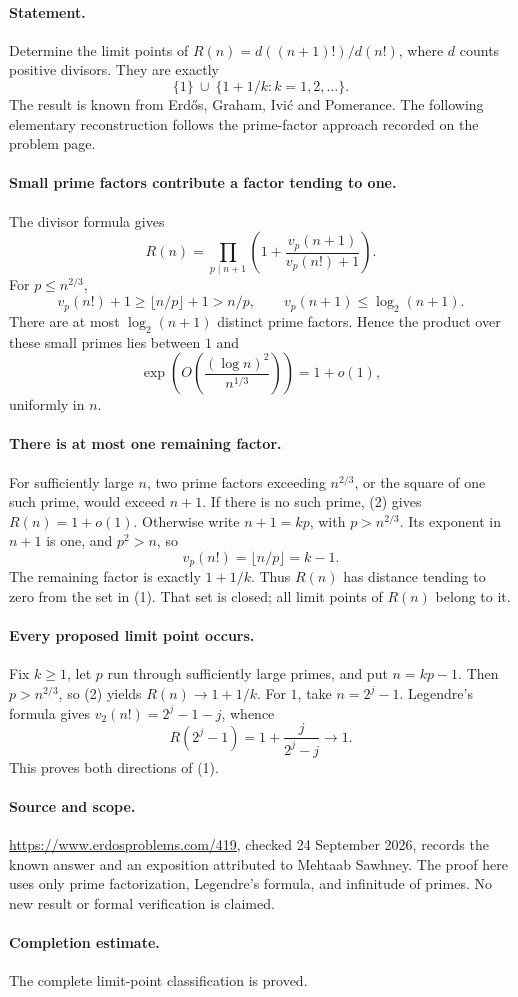 \paragraph{Statement.}
Determine the limit points of \(R(n)=d((n+1)!)/d(n!)\), where \(d\)
counts positive divisors. They are exactly
\[
 \{1\}\ \cup\ \{1+1/k:k=1,2,\ldots\}.
 \tag{1}
\]
The result is known from Erd\H{o}s, Graham, Ivi\'c and Pomerance.
The following elementary reconstruction follows the prime-factor approach
recorded on the problem page.

\paragraph{Small prime factors contribute a factor tending to one.}
The divisor formula gives
\[
 R(n)=\prod_{p\mid n+1}
 \left(1+\frac{v_p(n+1)}{v_p(n!)+1}\right).
\]
For \(p\leq n^{2/3}\),
\[
 v_p(n!)+1\geq\lfloor n/p\rfloor+1>n/p,\qquad
 v_p(n+1)\leq\log_2(n+1).
\]
There are at most \(\log_2(n+1)\) distinct prime factors. Hence the
product over these small primes lies between \(1\) and
\[
 \exp\left(O\left(\frac{(\log n)^2}{n^{1/3}}\right)\right)=1+o(1),
 \tag{2}
\]
uniformly in \(n\).

\paragraph{There is at most one remaining factor.}
For sufficiently large \(n\), two prime factors exceeding \(n^{2/3}\),
or the square of one such prime, would exceed \(n+1\).
If there is no such prime, (2) gives \(R(n)=1+o(1)\).
Otherwise write \(n+1=kp\), with \(p>n^{2/3}\).
Its exponent in \(n+1\) is one, and \(p^2>n\), so
\[
 v_p(n!)=\lfloor n/p\rfloor=k-1.
\]
The remaining factor is exactly \(1+1/k\). Thus \(R(n)\) has distance
tending to zero from the set in (1). That set is closed; all limit
points of \(R(n)\) belong to it.

\paragraph{Every proposed limit point occurs.}
Fix \(k\geq1\), let \(p\) run through sufficiently large primes, and put
\(n=kp-1\). Then \(p>n^{2/3}\), so (2) yields \(R(n)\to1+1/k\).
For \(1\), take \(n=2^j-1\). Legendre's formula gives
\(v_2(n!)=2^j-1-j\), whence
\[
 R(2^j-1)=1+\frac{j}{2^j-j}\longrightarrow1.
\]
This proves both directions of (1).

\paragraph{Source and scope.}
\url{https://www.erdosproblems.com/419}, checked 24 September 2026,
records the known answer and an exposition attributed to Mehtaab Sawhney.
The proof here uses only prime factorization, Legendre's formula, and
infinitude of primes. No new result or formal verification is claimed.

\paragraph{Completion estimate.}
The complete limit-point classification is proved.
